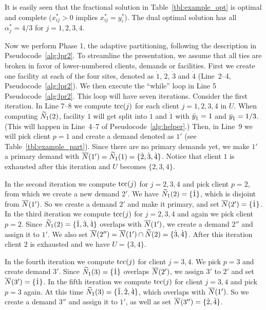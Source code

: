 \documentclass[oneside,final]{ucr}
\begin{document}
It is easily seen that the fractional solution in
Table~\ref{tbl:example_opt} is optimal and complete ($x_{ij}^\ast > 0$
implies $x_{ij}^\ast = y_i^\ast$). The dual optimal solution has all
$\alpha_j^\ast = 4/3$ for $j=1,2,3,4$.

Now we perform Phase 1, the adaptive partitioning, following the
description in Pseudocode~\ref{alg:lpr2}. To streamline the
presentation, we assume that all ties are broken in favor of
lower-numbered clients, demands or facilities.  First we create one
facility at each of the four sites, denoted as $\dot{1}$, $\dot{2}$,
$\dot{3}$ and $\dot{4}$ (Line~2--4, Pseudocode~\ref{alg:lpr2}).  We
then execute the ``while'' loop in Line 5
Pseudocode~\ref{alg:lpr2}. This loop will have seven iterations.
Consider the first iteration. In Line 7--8 we compute $\mbox{\rm{tcc}}(j)$ for
each client $j=1,2,3,4$ in $U$. When computing ${\widetilde N}_1(2)$,
facility $\dot{1}$ will get split into $\dot{1}$ and $\ddot{1}$ with
${\bar y}_{\dot{1}}=1$ and ${\bar y}_{\ddot{1}} = 1/3$. (This will happen in
Line~4--7 of Pseudocode~\ref{alg:helper}.)  Then, in Line~9 we will
pick client $p=1$ and create a demand denoted as $1'$ (see
Table~\ref{tbl:example_part}). Since there are no primary demands yet,
we make $1'$ a primary demand with ${\overline{N}}(1') = {\widetilde N}_1(1) =
\{\dot{2}, \dot{3}, \dot{4}\}$. Notice that client $1$ is exhausted
after this iteration and $U$ becomes $\{2,3,4\}$.

In the second iteration we compute $\mbox{\rm{tcc}}(j)$ for $j=2,3,4$ and pick
client $p=2$, from which we create a new demand $2'$. We have
${\widetilde N}_1(2) = \{\dot{1}\}$, which is disjoint from ${\overline{N}}(1')$. So
we create a demand $2'$ and make it primary, and set ${\overline{N}}(2') =
\{\dot{1}\}$. In the third iteration we compute $\mbox{\rm{tcc}}(j)$ for
$j=2,3,4$ and again we pick client $p=2$. Since ${\widetilde N}_1(2) =
\{\ddot{1}, \dot{3}, \dot{4}\}$ overlaps with ${\overline{N}}(1')$, we create
a demand $2''$ and assign it to $1'$. We also set ${\overline{N}}(2'') =
{\overline{N}}(1') \cap {\widetilde N}(2) = \{\dot{3}, \dot{4}\}$. After this
iteration client $2$ is exhausted and we have $U = \{3,4\}$.

In the fourth iteration we compute $\mbox{\rm{tcc}}(j)$ for client $j=3,4$. We
pick $p=3$ and create demand $3'$. Since ${\widetilde N}_1(3) = \{\dot{1}\}$
overlaps ${\overline{N}}(2')$, we assign $3'$ to $2'$ and set
${\overline{N}}(3') = \{\dot{1}\}$. In the fifth iteration we compute
$\mbox{\rm{tcc}}(j)$ for client $j=3,4$ and pick $p=3$ again. At this time
${\widetilde N}_1(3) = \{\ddot{1},\dot{2},\dot{4}\}$, which overlaps with
${\overline{N}}(1')$. So we create a demand $3''$ and assign it to $1'$, as
well as set ${\overline{N}}(3'') = \{\dot{2}, \dot{4}\}$.
\end{document}
